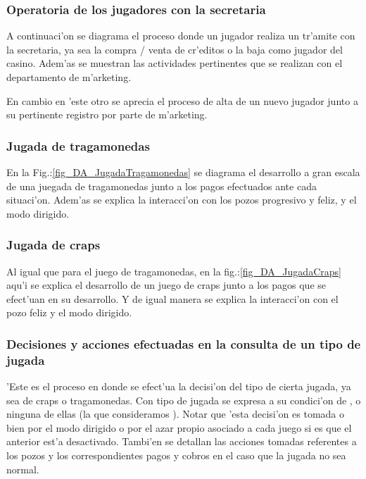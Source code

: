 \subsubsection{Operatoria de los jugadores con la secretaria}
A continuaci'on se diagrama el proceso donde un jugador realiza un tr'amite con la secretaria, ya sea la compra / venta de cr'editos o la baja como jugador del casino. Adem'as se muestran las actividades pertinentes que se realizan con el departamento de m'arketing. 


\clearpage

En cambio en 'este otro se aprecia el proceso de alta de un nuevo jugador junto a su pertinente registro por parte de m'arketing.



\clearpage




\subsubsection{Jugada de tragamonedas}
En la Fig.:\ref{fig_DA_JugadaTragamonedas} se diagrama el desarrollo a gran escala de una juegada de tragamonedas junto a los pagos efectuados ante cada situaci'on. Adem'as se explica la interacci'on con los pozos progresivo y feliz, y el modo dirigido.


\clearpage





\subsubsection{Jugada de craps}
Al igual que para el juego de tragamonedas, en la fig.:\ref{fig_DA_JugadaCraps} aqu'i se explica el desarrollo de un juego de craps junto a los pagos que se efect'uan en su desarrollo. Y de igual manera se explica la interacci'on con el pozo feliz y el modo dirigido.


\clearpage





\subsubsection{Decisiones y acciones efectuadas en la consulta de un tipo de jugada}
'Este es el proceso en donde se efect'ua la decisi'on del tipo de cierta jugada, ya sea de craps o tragamonedas. Con tipo de jugada se expresa a su condici'on de ,  o ninguna de ellas (la que consideramos ). Notar que 'esta decisi'on es tomada o bien por el modo dirigido o por el azar propio asociado a cada juego si es que el anterior est'a desactivado. Tambi'en se detallan las acciones tomadas referentes a los pozos y los correspondientes pagos y cobros en el caso que la jugada no sea normal.





